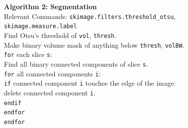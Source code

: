 \documentclass[10pt]{article}
\begin{document}
\begin{center}
\begin{minipage}[c]{0.75\textwidth}
\noindent\makebox[\linewidth]{\rule{\textwidth}{0.4pt}}
\noindent \textbf{Algorithm 2: Segmentation}\\
Relevant Commands: \texttt{skimage.filters.threshold\_otsu}, \texttt{skimage.measure.label}\\
\noindent\makebox[\linewidth]{\rule{\textwidth}{0.2pt}}
Find Otsu's threshold of \texttt{vol}, \texttt{thresh}.\\
Make binary volume mask of anything below \texttt{thresh}, \texttt{volBW}.\\
\texttt{for} each slice \texttt{s}:\\
\hspace*{1em} Find all binary connected components of slice \texttt{s}.\\
\hspace*{1em} \texttt{for} all connected components \texttt{i}:\\
\hspace*{2em} \texttt{if} connected component \texttt{i} touches the edge of the image:\\
\hspace*{3em} delete connected component \texttt{i}.\\
\hspace*{2em} \texttt{endif}\\
\hspace*{1em} \texttt{endfor}\\
\texttt{endfor}\\
\noindent\makebox[\linewidth]{\rule{\textwidth}{0.2pt}}
\end{minipage}
\end{center}
\end{document}
